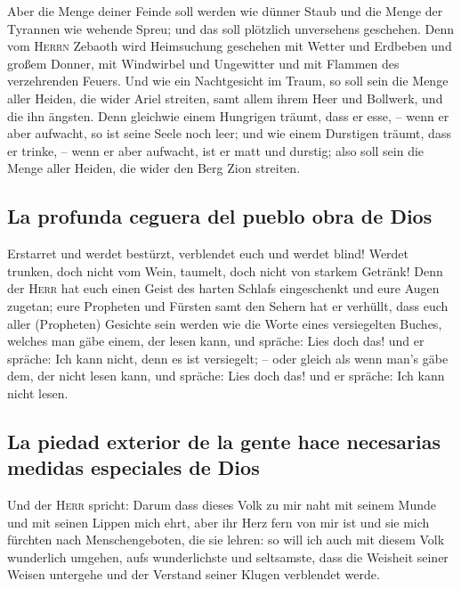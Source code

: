  Aber die Menge deiner Feinde soll werden wie dünner Staub
und die Menge der Tyrannen wie wehende Spreu; und das soll plötzlich
unversehens geschehen.  Denn vom \textsc{Herrn} Zebaoth
wird Heimsuchung geschehen mit Wetter und Erdbeben und großem Donner,
mit Windwirbel und Ungewitter und mit Flammen des verzehrenden Feuers.
 Und wie ein Nachtgesicht im Traum, so soll sein die Menge
aller Heiden, die wider Ariel streiten, samt allem ihrem Heer und
Bollwerk, und die ihn ängsten.  Denn gleichwie einem
Hungrigen träumt, dass er esse, -- wenn er aber aufwacht, so ist seine
Seele noch leer; und wie einem Durstigen träumt, dass er trinke, -- wenn
er aber aufwacht, ist er matt und durstig; also soll sein die Menge
aller Heiden, die wider den Berg Zion streiten.

\hypertarget{la-profunda-ceguera-del-pueblo-obra-de-dios}{%
\subsection{La profunda ceguera del pueblo obra de
Dios}\label{la-profunda-ceguera-del-pueblo-obra-de-dios}}

 Erstarret und werdet bestürzt, verblendet euch und werdet
blind! Werdet trunken, doch nicht vom Wein, taumelt, doch nicht von
starkem Getränk!  Denn der \textsc{Herr} hat euch einen
Geist des harten Schlafs eingeschenkt und eure Augen zugetan; eure
Propheten und Fürsten samt den Sehern hat er verhüllt, 
dass euch aller (Propheten) Gesichte sein werden wie die Worte eines
versiegelten Buches, welches man gäbe einem, der lesen kann, und
spräche: Lies doch das! und er spräche: Ich kann nicht, denn es ist
versiegelt; --  oder gleich als wenn man's gäbe dem, der
nicht lesen kann, und spräche: Lies doch das! und er spräche: Ich kann
nicht lesen.

\hypertarget{la-piedad-exterior-de-la-gente-hace-necesarias-medidas-especiales-de-dios}{%
\subsection{La piedad exterior de la gente hace necesarias medidas
especiales de
Dios}\label{la-piedad-exterior-de-la-gente-hace-necesarias-medidas-especiales-de-dios}}

 Und der \textsc{Herr} spricht: Darum dass dieses Volk zu
mir naht mit seinem Munde und mit seinen Lippen mich ehrt, aber ihr Herz
fern von mir ist und sie mich fürchten nach Menschengeboten, die sie
lehren:  so will ich auch mit diesem Volk wunderlich
umgehen, aufs wunderlichste und seltsamste, dass die Weisheit seiner
Weisen untergehe und der Verstand seiner Klugen verblendet werde.

